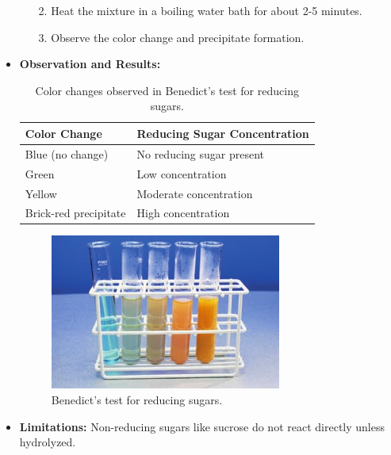 \begin{itemize}
\begin{itemize}
        \item[2.] Heat the mixture in a boiling water bath for about 2-5 minutes.
        \item[3.] Observe the color change and precipitate formation.
    \end{itemize}
    \item \textbf{Observation and Results:}
    \begin{table}[h!]
        \centering
        \begin{tabular}{|l|l|}
        \hline
        \textbf{Color Change}          & \textbf{Reducing Sugar Concentration} \\ \hline
        Blue (no change)               & No reducing sugar present             \\ \hline
        Green                          & Low concentration                     \\ \hline
        Yellow                         & Moderate concentration                \\ \hline
        Brick-red precipitate          & High concentration                    \\ \hline
        \end{tabular}
        \caption{Color changes observed in Benedict's test for reducing sugars.}
        \label{tab:reducing_sugars}
    \end{table}
    \begin{figure}[H]
        \centering
        \includegraphics[scale=1]{Biology/1A/Images/1A-2-5.bmp}
        \caption{Benedict's test for reducing sugars.}
    \end{figure}
    \item \textbf{Limitations:} Non-reducing sugars like sucrose do not react directly unless hydrolyzed.
\end{itemize}